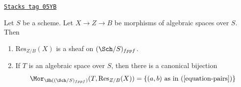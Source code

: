 \begin{lemma}
\label{criteria-lemma-restriction-of-scalars-sheaf}
\href{https://stacks.math.columbia.edu/tag/05YB}{\texttt{Stacks tag 05YB}}

Let $S$ be a scheme. Let $X \to Z \to B$ be morphisms of
algebraic spaces over $S$. Then
\begin{enumerate}
\item $\text{Res}_{Z/B}(X)$ is a sheaf on
$(\Sch/S)_{fppf}$.
\item If $T$ is an algebraic space over $S$, then there is a
canonical bijection
$$
\Mor_{\Sh((\Sch/S)_{fppf})}(T, \text{Res}_{Z/B}(X))
=
\{(a, b)\text{ as in }(\ref{equation-pairs})\}
$$
\end{enumerate}
\end{lemma}

